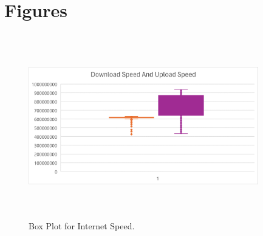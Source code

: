 \documentclass[conference]{IEEEtran}
\begin{document}
\section{Figures}
\begin{figure}[htbp]
    \centerline{\includegraphics[width=10cm,height=8cm,keepaspectratio]{Figures/Picture1.png}}
    \caption{Box Plot for Internet Speed.}
    \label{fig2}
\end{figure}
\end{document}
